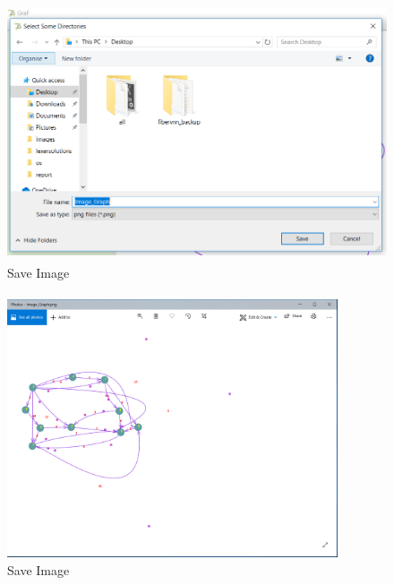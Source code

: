 \documentclass[a4paper,10pt]{article}
\begin{document}
\paragraph{}	
\begin{figure}[H]
		\centering
		\includegraphics[height = 3in]{saveImage2.png}
		\caption[Optional caption]{Save Image}
		\label{fig:Repository}
	\end{figure}
\paragraph{}	
\begin{figure}[H]
		\centering
		\includegraphics[height = 3in]{imageGraph3.png}
		\caption[Optional caption]{Save Image}
		\label{fig:Repository}
	\end{figure}
\paragraph{}
\end{document}
